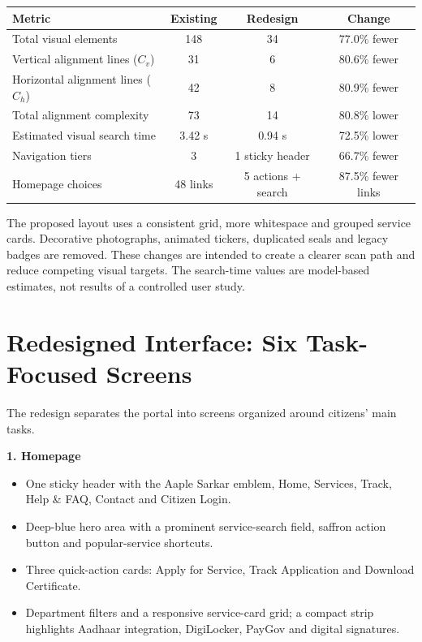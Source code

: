 \documentclass[10pt,a4paper]{article}
\begin{document}
\begin{center}
\small
\begin{tabularx}{\textwidth}{|>{\raggedright\arraybackslash}X|c|c|c|}
\hline
\textbf{Metric} & \textbf{Existing} & \textbf{Redesign} & \textbf{Change}\\
\hline
Total visual elements & 148 & 34 & 77.0\% fewer\\
\hline
Vertical alignment lines ($C_v$) & 31 & 6 & 80.6\% fewer\\
\hline
Horizontal alignment lines ($C_h$) & 42 & 8 & 80.9\% fewer\\
\hline
Total alignment complexity & 73 & 14 & 80.8\% lower\\
\hline
Estimated visual search time & 3.42 s & 0.94 s & 72.5\% lower\\
\hline
Navigation tiers & 3 & 1 sticky header & 66.7\% fewer\\
\hline
Homepage choices & 48 links & 5 actions + search & 87.5\% fewer links\\
\hline
\end{tabularx}
\end{center}

The proposed layout uses a consistent grid, more whitespace and grouped service cards. Decorative photographs, animated tickers, duplicated seals and legacy badges are removed. These changes are intended to create a clearer scan path and reduce competing visual targets. The search-time values are model-based estimates, not results of a controlled user study.

\section{Redesigned Interface: Six Task-Focused Screens}
The redesign separates the portal into screens organized around citizens' main tasks.

\textbf{1. Homepage}
\begin{itemize}
\item One sticky header with the Aaple Sarkar emblem, Home, Services, Track, Help \& FAQ, Contact and Citizen Login.
\item Deep-blue hero area with a prominent service-search field, saffron action button and popular-service shortcuts.
\item Three quick-action cards: Apply for Service, Track Application and Download Certificate.
\item Department filters and a responsive service-card grid; a compact strip highlights Aadhaar integration, DigiLocker, PayGov and digital signatures.
\end{itemize}
\end{document}
